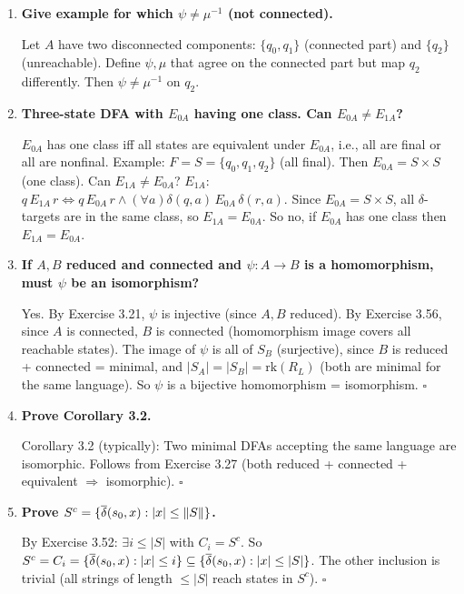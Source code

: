 \begin{enumerate}[{3.}1.]
\item \textbf{Give example for which $\psi\neq\mu^{-1}$ (not connected).}

Let $A$ have two disconnected components: $\{q_0,q_1\}$ (connected part) and $\{q_2\}$ (unreachable). Define $\psi,\mu$ that agree on the connected part but map $q_2$ differently. Then $\psi\neq\mu^{-1}$ on $q_2$.

\item \textbf{Three-state DFA with $E_{0A}$ having one class. Can $E_{0A}\neq E_{1A}$?}

$E_{0A}$ has one class iff all states are equivalent under $E_{0A}$, i.e., all are final or all are nonfinal. Example: $F=S=\{q_0,q_1,q_2\}$ (all final). Then $E_{0A}=S\times S$ (one class). Can $E_{1A}\neq E_{0A}$? $E_{1A}$: $q\,E_{1A}\,r\Leftrightarrow q\,E_{0A}\,r\wedge(\forall a)\delta(q,a)\,E_{0A}\,\delta(r,a)$. Since $E_{0A}=S\times S$, all $\delta$-targets are in the same class, so $E_{1A}=E_{0A}$. So no, if $E_{0A}$ has one class then $E_{1A}=E_{0A}$.

\item \textbf{If $A,B$ reduced and connected and $\psi: A\to B$ is a homomorphism, must $\psi$ be an isomorphism?}

Yes. By Exercise 3.21, $\psi$ is injective (since $A,B$ reduced). By Exercise 3.56, since $A$ is connected, $B$ is connected (homomorphism image covers all reachable states). The image of $\psi$ is all of $S_B$ (surjective), since $B$ is reduced + connected = minimal, and $|S_A|=|S_B|=\mathrm{rk}(R_L)$ (both are minimal for the same language). So $\psi$ is a bijective homomorphism = isomorphism. $\square$

\item \textbf{Prove Corollary 3.2.}

Corollary 3.2 (typically): Two minimal DFAs accepting the same language are isomorphic. Follows from Exercise 3.27 (both reduced + connected + equivalent $\Rightarrow$ isomorphic). $\square$

\item \textbf{Prove $S^c=\{\overline{\delta}(s_0,x):|x|\leq\|S\|\}$.}

By Exercise 3.52: $\exists i\leq|S|$ with $C_i=S^c$. So $S^c=C_i=\{\overline{\delta}(s_0,x):|x|\leq i\}\subseteq\{\overline{\delta}(s_0,x):|x|\leq|S|\}$. The other inclusion is trivial (all strings of length $\leq|S|$ reach states in $S^c$). $\square$


\end{enumerate}
